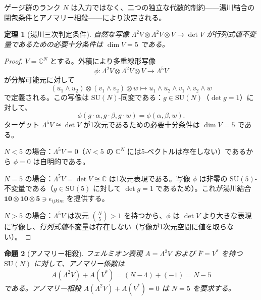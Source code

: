 \documentclass[12pt]{article}
\theoremstyle{plain}
\newtheorem{theorem}{定理}[section]
\newtheorem{proposition}[theorem]{命題}
\theoremstyle{definition}
\numberwithin{equation}{section}
\newcommand{\C}{\mathbb{C}}
\begin{document}
ゲージ群のランク $N$ は入力ではなく、二つの独立な代数的制約——湯川結合の閉包条件とアノマリー相殺——により決定される。

\begin{theorem}[湯川三次判定条件]\label{thm:yukawa}
自然な写像 $\Lambda^2 V\otimes\Lambda^2 V\otimes V\to\det V$ が行列式値不変量であるための必要十分条件は $\dim V=5$ である。
\end{theorem}

\begin{proof}
$V=\C^N$ とする。外積により多重線形写像
\begin{equation}
\phi:\Lambda^2 V\otimes\Lambda^2 V\otimes V\to\Lambda^5 V
\end{equation}
が分解可能元に対して
\begin{equation}
(u_1\wedge u_2)\otimes(v_1\wedge v_2)\otimes w \mapsto u_1\wedge u_2\wedge v_1\wedge v_2\wedge w
\end{equation}
で定義される。この写像は $\mathrm{SU}(N)$-同変である：$g\in\mathrm{SU}(N)$（$\det g=1$）に対して、
\begin{equation}
\phi(g\cdot\alpha,g\cdot\beta,g\cdot w) = \phi(\alpha,\beta,w).
\end{equation}
ターゲット $\Lambda^5 V\cong\det V$ が1次元であるための必要十分条件は $\dim V=5$ である。

$N<5$ の場合：$\Lambda^5 V=0$（$N<5$ の $\C^N$ には5-ベクトルは存在しない）であるから $\phi=0$ は自明的である。

$N=5$ の場合：$\Lambda^5 V=\det V\cong\C$ は1次元表現である。写像 $\phi$ は非零の $\mathrm{SU}(5)$-不変量である（$g\in\mathrm{SU}(5)$ に対して $\det g=1$ であるため）。これが湯川結合 $\mathbf{10}\otimes\mathbf{10}\otimes\mathbf{5}\ni\epsilon_{ijklm}$ を提供する。

$N>5$ の場合：$\Lambda^5 V$ は次元 $\binom{N}{5}>1$ を持つから、$\phi$ は $\det V$ より大きな表現に写像し、\emph{行列式値}不変量は存在しない（写像が1次元空間に値を取らない）。
\end{proof}

\begin{proposition}[アノマリー相殺]\label{prop:anomaly}
フェルミオン表現 $A=\Lambda^2 V$ および $\bar{F}=V^*$ を持つ $\mathrm{SU}(N)$ に対して、アノマリー係数は
\begin{equation}
A(\Lambda^2 V)+A(V^*) = (N-4)+(-1) = N-5
\end{equation}
である。アノマリー相殺 $A(\Lambda^2 V)+A(V^*)=0$ は $N=5$ を要求する。
\end{proposition}
\end{document}
